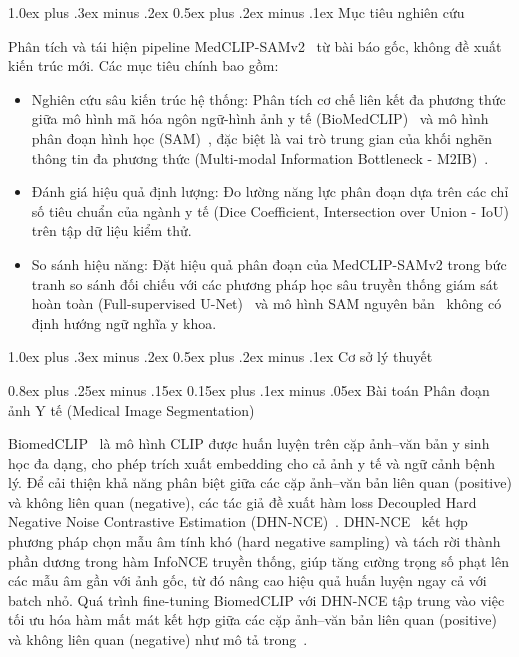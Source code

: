 \documentclass[conference]{IEEEtran}
\makeatletter
\def\section{\@startsection{section}{1}{\z@}%
  {1.0ex plus .3ex minus .2ex}%
  {0.5ex plus .2ex minus .1ex}%
  {\reset@font\normalsize\bfseries\centering}}%
\def\subsection{\@startsection{subsection}{2}{\z@}%
  {0.8ex plus .25ex minus .15ex}%
  {0.15ex plus .1ex minus .05ex}%
  {\reset@font\normalsize\itshape}}%
\makeatother
\begin{document}
\section{Mục tiêu nghiên cứu}
\label{sec:muctieu}

Phân tích và tái hiện pipeline MedCLIP-SAMv2~\cite{ref1} từ bài báo gốc, không đề xuất kiến trúc mới. Các mục tiêu chính bao gồm:

\begin{itemize}
    \item Nghiên cứu sâu kiến trúc hệ thống: Phân tích cơ chế liên kết đa phương thức giữa mô hình mã hóa ngôn ngữ-hình ảnh y tế (BioMedCLIP)~\cite{ref3} và mô hình phân đoạn hình học (SAM)~\cite{ref2,ref4}, đặc biệt là vai trò trung gian của khối nghẽn thông tin đa phương thức (Multi-modal Information Bottleneck - M2IB)~\cite{ref7}.
    \item Đánh giá hiệu quả định lượng: Đo lường năng lực phân đoạn dựa trên các chỉ số tiêu chuẩn của ngành y tế (Dice Coefficient, Intersection over Union - IoU) trên tập dữ liệu kiểm thử.
    \item So sánh hiệu năng: Đặt hiệu quả phân đoạn của MedCLIP-SAMv2 trong bức tranh so sánh đối chiếu với các phương pháp học sâu truyền thống giám sát hoàn toàn (Full-supervised U-Net)~\cite{ref6} và mô hình SAM nguyên bản~\cite{ref2,ref4} không có định hướng ngữ nghĩa y khoa.
\end{itemize}

\section{Cơ sở lý thuyết}
\label{sec:coso}

\subsection{Bài toán Phân đoạn ảnh Y tế (Medical Image Segmentation)}

BiomedCLIP~\cite{ref3} là mô hình CLIP được huấn luyện trên cặp ảnh--văn bản y sinh học đa dạng, cho phép trích xuất embedding cho cả ảnh y tế và ngữ cảnh bệnh lý. Để cải thiện khả năng phân biệt giữa các cặp ảnh--văn bản liên quan (positive) và không liên quan (negative), các tác giả đề xuất hàm loss Decoupled Hard Negative Noise Contrastive Estimation (DHN-NCE)~\cite{ref1}. DHN-NCE~\cite{ref1} kết hợp phương pháp chọn mẫu âm tính khó (hard negative sampling) và tách rời thành phần dương trong hàm InfoNCE truyền thống, giúp tăng cường trọng số phạt lên các mẫu âm gần với ảnh gốc, từ đó nâng cao hiệu quả huấn luyện ngay cả với batch nhỏ. Quá trình fine-tuning BiomedCLIP với DHN-NCE tập trung vào việc tối ưu hóa hàm mất mát kết hợp giữa các cặp ảnh--văn bản liên quan (positive) và không liên quan (negative) như mô tả trong~\cite{ref1}.
\end{document}
